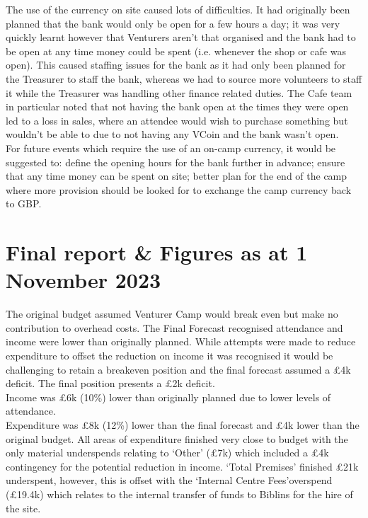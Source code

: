 The use of the currency on site caused lots of difficulties. It had originally been planned that the bank would only be open for a few hours a day; it was very quickly learnt however that Venturers aren't that organised and the bank had to be open at any time money could be spent (i.e. whenever the shop or cafe was open). This caused staffing issues for the bank as it had only been planned for the Treasurer to staff the bank, whereas we had to source more volunteers to staff it while the Treasurer was handling other finance related duties. The Cafe team in particular noted that not having the bank open at the times they were open led to a loss in sales, where an attendee would wish to purchase something but wouldn't be able to due to not having any VCoin and the bank wasn't open. \\

For future events which require the use of an on-camp currency, it would be suggested to: define the opening hours for the bank further in advance; ensure that any time money can be spent on site; better plan for the end of the camp where more provision should be looked for to exchange the camp currency back to GBP. 

\section{Final report \& Figures as at 1 November 2023}
The original budget assumed Venturer Camp would break even but make no contribution to overhead costs. The Final Forecast recognised attendance and income were lower than originally planned. While attempts were made to reduce expenditure to offset the reduction on income it was recognised it would be challenging to retain a breakeven position and the final forecast assumed a \pounds4k deficit. The final position presents a \pounds2k deficit.\\

Income was \pounds6k (10\%) lower than originally planned due to lower levels of attendance.\\

Expenditure was \pounds8k (12\%) lower than the final forecast and \pounds4k lower than the original budget. All areas of expenditure finished very close to budget with the only material underspends relating to `Other' (\pounds7k) which included a \pounds4k contingency for the potential reduction in income. `Total Premises' finished \pounds21k underspent, however, this is offset with the `Internal Centre Fees'overspend (\pounds19.4k) which relates to the internal transfer of funds to Biblins for the hire of the site.

